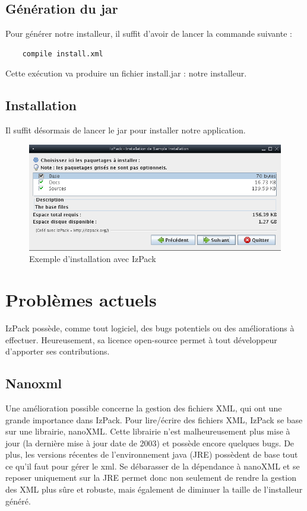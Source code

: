 \subsection{Génération du jar}
Pour générer notre installeur, il suffit d'avoir de lancer la commande suivante :
\begin{verbatim}
	compile install.xml
\end{verbatim}
Cette exécution va produire un fichier install.jar : notre installeur.
\subsection{Installation}
Il suffit désormais de lancer le jar pour installer notre application.
\begin{figure}[H]
	\centering
	\includegraphics[width=15cm]{../image/installSample.png}
	\caption{Exemple d'installation avec IzPack}
\end{figure}

\section{Problèmes actuels}
IzPack possède, comme tout logiciel, des bugs potentiels ou des améliorations à effectuer.
Heureusement, sa licence open-source permet à tout développeur d'apporter ses contributions.

\subsection{Nanoxml}
Une amélioration possible concerne la gestion des fichiers XML, qui ont une grande importance dans IzPack.
Pour lire/écrire des fichiers XML, IzPack se base sur une librairie, nanoXML. Cette librairie n'est malheureusement plus mise à jour (la dernière mise à jour date de 2003) et possède encore quelques bugs.
De plus, les versions récentes de l'environnement java (JRE) possèdent de base tout ce qu'il faut pour gérer le xml.
Se débarasser de la dépendance à nanoXML et se reposer uniquement sur la JRE permet donc non seulement de rendre la gestion des XML plus sûre et robuste, mais également de diminuer la taille de l'installeur généré.